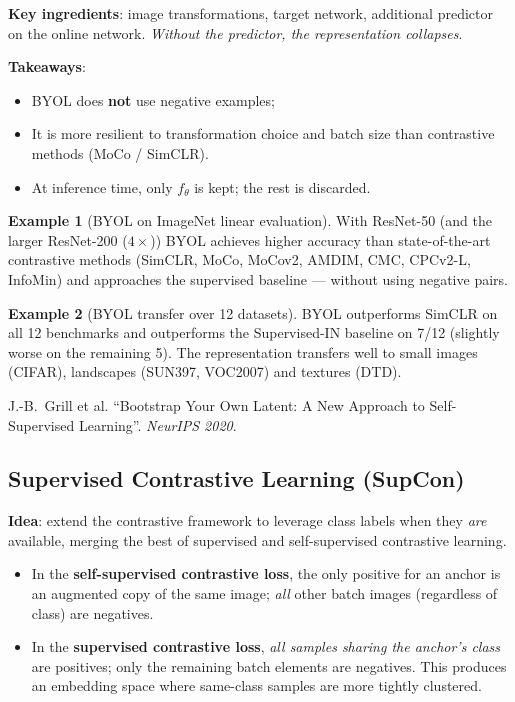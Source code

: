 \documentclass[11pt,a4paper]{article}
\theoremstyle{definition}
\newtheorem{example}{Example}[section]
\theoremstyle{plain}
\theoremstyle{remark}
\begin{document}
\textbf{Key ingredients}: image transformations, target network, additional predictor on the online network. \emph{Without the predictor, the representation collapses}.

\textbf{Takeaways}:
\begin{itemize}
    \item BYOL does \textbf{not} use negative examples;
    \item It is more resilient to transformation choice and batch size than contrastive methods (MoCo / SimCLR).
    \item At inference time, only $f_\theta$ is kept; the rest is discarded.
\end{itemize}

\begin{example}[BYOL on ImageNet linear evaluation]
With ResNet-50 (and the larger ResNet-200 ($4\times$)) BYOL achieves higher accuracy than state-of-the-art contrastive methods (SimCLR, MoCo, MoCov2, AMDIM, CMC, CPCv2-L, InfoMin) and approaches the supervised baseline --- without using negative pairs.
\end{example}

\begin{example}[BYOL transfer over 12 datasets]
BYOL outperforms SimCLR on all 12 benchmarks and outperforms the Supervised-IN baseline on 7/12 (slightly worse on the remaining 5). The representation transfers well to small images (CIFAR), landscapes (SUN397, VOC2007) and textures (DTD).
\end{example}

\begin{tcolorbox}[colback=blue!5!white,colframe=blue!60!black,title={Reference}]
J.-B.\ Grill et al. ``Bootstrap Your Own Latent: A New Approach to Self-Supervised Learning''. \textit{NeurIPS 2020}.
\end{tcolorbox}

\subsection{Supervised Contrastive Learning (SupCon)}

\textbf{Idea}: extend the contrastive framework to leverage class labels when they \emph{are} available, merging the best of supervised and self-supervised contrastive learning.

\begin{itemize}
    \item In the \textbf{self-supervised contrastive loss}, the only positive for an anchor is an augmented copy of the same image; \emph{all} other batch images (regardless of class) are negatives.
    \item In the \textbf{supervised contrastive loss}, \emph{all samples sharing the anchor's class} are positives; only the remaining batch elements are negatives. This produces an embedding space where same-class samples are more tightly clustered.
\end{itemize}
\end{document}
